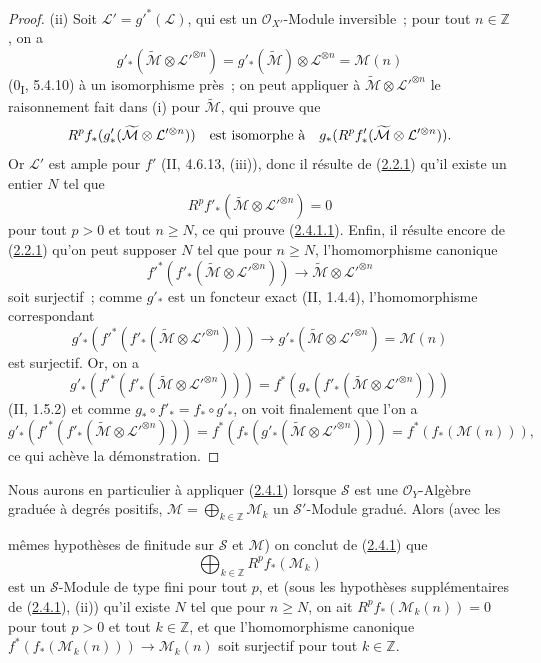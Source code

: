 \begin{proof}
(ii) Soit $\mathcal L'=g'^*(\mathcal L)$, qui est un
$\mathcal O_{X'}$-Module inversible~; pour tout $n\in\mathbb Z$, on a
\[
g'_*(\widetilde{\mathcal M}\otimes\mathcal L'^{\otimes n})
=g'_*(\widetilde{\mathcal M})\otimes\mathcal L^{\otimes n}
=\mathcal M(n)
\]
(0\textsubscript{I}, 5.4.10) à un isomorphisme près~; on peut appliquer
à $\widetilde{\mathcal M}\otimes\mathcal L'^{\otimes n}$ le
raisonnement fait dans (i) pour $\widetilde{\mathcal M}$, qui prouve que
\[
R^pf_*(g'_*(\widetilde{\mathcal M}\otimes\mathcal L'^{\otimes n}))
\quad\hbox{est isomorphe à}\quad
g_*(R^pf'_*(\widetilde{\mathcal M}\otimes\mathcal L'^{\otimes n})).
\]
Or $\mathcal L'$ est ample pour $f'$ (II, 4.6.13, (iii)), donc il résulte
de (\hyperref[III.2.2.1-fr]{2.2.1}) qu'il existe un entier $N$ tel que
\[
R^pf'_*(\widetilde{\mathcal M}\otimes\mathcal L'^{\otimes n})=0
\]
pour tout $p>0$ et tout $n\geq N$, ce qui prouve
(\hyperref[III.2.4.1.1-fr]{2.4.1.1}). Enfin, il résulte encore de
(\hyperref[III.2.2.1-fr]{2.2.1}) qu'on peut supposer $N$ tel que pour
$n\geq N$, l'homomorphisme canonique
\[
f'^*(f'_*(\widetilde{\mathcal M}\otimes\mathcal L'^{\otimes n}))
\longrightarrow\widetilde{\mathcal M}\otimes\mathcal L'^{\otimes n}
\]
soit surjectif~; comme $g'_*$ est un foncteur exact (II, 1.4.4),
l'homomorphisme correspondant
\[
g'_*(f'^*(f'_*(\widetilde{\mathcal M}\otimes
\mathcal L'^{\otimes n})))
\longrightarrow
g'_*(\widetilde{\mathcal M}\otimes\mathcal L'^{\otimes n})
=\mathcal M(n)
\]
est surjectif. Or, on a
\[
g'_*(f'^*(f'_*(\widetilde{\mathcal M}\otimes
\mathcal L'^{\otimes n})))
=f^*(g_*(f'_*(\widetilde{\mathcal M}\otimes
\mathcal L'^{\otimes n})))
\]
(II, 1.5.2) et comme $g_*\circ f'_* = f_*\circ g'_*$, on voit
finalement que l'on a
\[
g'_*(f'^*(f'_*(\widetilde{\mathcal M}\otimes\mathcal L'^{\otimes n})))
=f^*(f_*(g'_*(\widetilde{\mathcal M}\otimes
\mathcal L'^{\otimes n})))=f^*(f_*(\mathcal M(n))),
\]
ce qui achève la démonstration.
\end{proof}

\begin{env}[2.4.2]
\label{III.2.4.2-fr}
Nous aurons en particulier à appliquer
(\hyperref[III.2.4.1-fr]{2.4.1}) lorsque $\mathcal S$ est une
$\mathcal O_Y$-Algèbre graduée à degrés positifs,
$\mathcal M=\bigoplus_{k\in\mathbb Z}\mathcal M_k$ un
$\mathcal S'$-Module gradué. Alors (avec les

mêmes hypothèses de finitude sur $\mathcal S$ et $\mathcal M$) on conclut
de (\hyperref[III.2.4.1-fr]{2.4.1}) que
\[
\bigoplus_{k\in\mathbb Z}R^pf_*(\mathcal M_k)
\]
est un $\mathcal S$-Module de type fini pour tout $p$, et (sous les
hypothèses supplémentaires de (\hyperref[III.2.4.1-fr]{2.4.1}), (ii))
qu'il existe $N$ tel que pour $n\geq N$, on ait
$R^pf_*(\mathcal M_k(n))=0$ pour tout $p>0$ et tout $k\in\mathbb Z$, et
que l'homomorphisme canonique
$f^*(f_*(\mathcal M_k(n)))\to\mathcal M_k(n)$ soit surjectif pour tout
$k\in\mathbb Z$.
\end{env}

